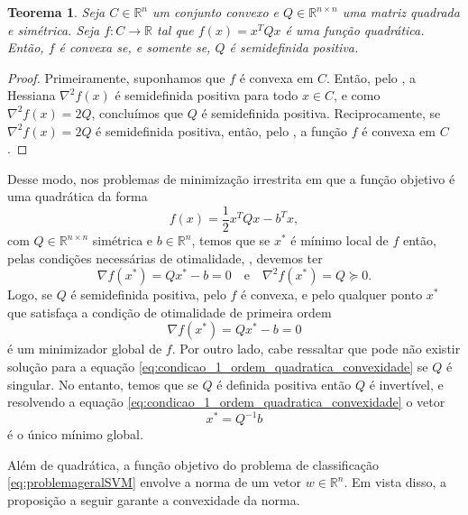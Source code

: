 \documentclass[12pt,a4paper]{scrartcl}
\def\RR{\mathds{R}}
\newtheorem{teo}{Teorema}
\theoremstyle{definition}%
\begin{document}
\begin{teo} \label{teo:funcao_quadratica_e_convexa}
Seja $C \in \RR^{n}$ um conjunto convexo e $Q \in \RR^{n\times n}$ uma matriz quadrada e simétrica. Seja $f:C \rightarrow \RR$ tal que $f(x) = x^{T}Qx$ é uma função quadrática. Então, $f$ é convexa se, e somente se, $Q$ é semidefinida positiva.
\end{teo}
\begin{proof}
Primeiramente, suponhamos que $f$ é convexa em $C$. Então, pelo , a Hessiana $\nabla^{2} f(x)$ é semidefinida positiva para todo $x\in C$, e como $\nabla^{2} f(x) = 2Q$, concluímos que $Q$ é semidefinida positiva. Reciprocamente, se $\nabla^{2} f(x) = 2Q$ é semidefinida positiva, então, pelo , a função $f$ é convexa em $C$.
\end{proof}

Desse modo, nos problemas de minimização irrestrita em que a função objetivo é uma quadrática da forma
\[
f(x) = \dfrac{1}{2}x^{T}Qx - b^{T}x,
\]
com $Q\in \RR^{n\times n}$ simétrica e $b\in \RR^{n}$, 
temos que se $x^{*}$ é mínimo local de $f$ então, pelas condições necessárias de otimalidade, , devemos ter
\[
\nabla f(x^{*})= Qx^{*}-b =0 \quad \text{e} \quad \nabla^{2} f(x^{*})=Q \succcurlyeq 0.
\]
Logo, se $Q$ é semidefinida positiva, pelo  $f$ é convexa, e pelo  qualquer ponto $x^{*}$ que satisfaça a condição de otimalidade de primeira ordem 
\[ \label{eq:condicao_1_ordem_quadratica_convexidade}
\nabla f(x^{*})= Qx^{*}-b =0
\] 
é um minimizador global de $f$. Por outro lado, cabe ressaltar que pode não existir solução para a equação \eqref{eq:condicao_1_ordem_quadratica_convexidade} se $Q$ é singular. No entanto, temos que se $Q$ é definida positiva então $Q$ é invertível, e resolvendo a equação \eqref{eq:condicao_1_ordem_quadratica_convexidade} o vetor
\[
x^{*} = Q^{-1}b
\]  
é o único mínimo global.

Além de quadrática, a função objetivo do problema de classificação \eqref{eq:problemageralSVM} envolve a norma de um vetor $w \in \RR^{n}$. Em vista disso, a proposição a seguir garante a convexidade da norma.
\end{document}
